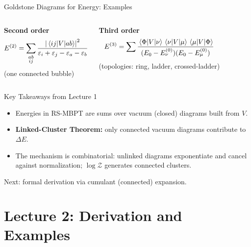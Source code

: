 \documentclass[aspectratio=169,11pt]{beamer}
\newcommand{\V}{V}
\newcommand{\Z}{\mathcal{Z}}
\begin{document}
\begin{frame}{Goldstone Diagrams for Energy: Examples}
\begin{columns}
\textbf{Second order}
\[
E^{(2)} = \sum_{\substack{ab \\ ij}} 
\frac{\abs{\matrixel{ij}{\V}{ab}}^2}{\varepsilon_i+\varepsilon_j-\varepsilon_a-\varepsilon_b}
\]
(one connected bubble)
\medskip

\textbf{Third order}
\[
E^{(3)} = \sum \frac{\matrixel{\Phi}{\V}{\nu}\matrixel{\nu}{\V}{\mu}\matrixel{\mu}{\V}{\Phi}}
{(E_0-E_\nu^{(0)})(E_0-E_\mu^{(0)})}
\]
(topologies: ring, ladder, crossed-ladder)
\centering
{}

\medskip

\end{columns}
\end{frame}

\begin{frame}{Key Takeaways from Lecture 1}
\begin{itemize}
  \item Energies in RS-MBPT are sums over vacuum (closed) diagrams built from $\V$.
  \item \textbf{Linked-Cluster Theorem:} only connected vacuum diagrams contribute to $\Delta E$.
  \item The mechanism is combinatorial: unlinked diagrams exponentiate and cancel against normalization; \(\log \Z\) generates connected clusters.
\end{itemize}
Next: formal derivation via cumulant (connected) expansion.
\end{frame}

\section*{Lecture 2: Derivation and Examples}
\end{document}
